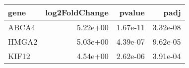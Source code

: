 \begin{tabular}{lrrr}
\toprule
 gene &  log2FoldChange &   pvalue &     padj \\
\midrule
ABCA4 &        5.22e+00 & 1.67e-11 & 3.32e-08 \\
HMGA2 &        5.03e+00 & 4.39e-07 & 9.62e-05 \\
KIF12 &        4.54e+00 & 2.62e-06 & 3.91e-04 \\
\bottomrule
\end{tabular}
